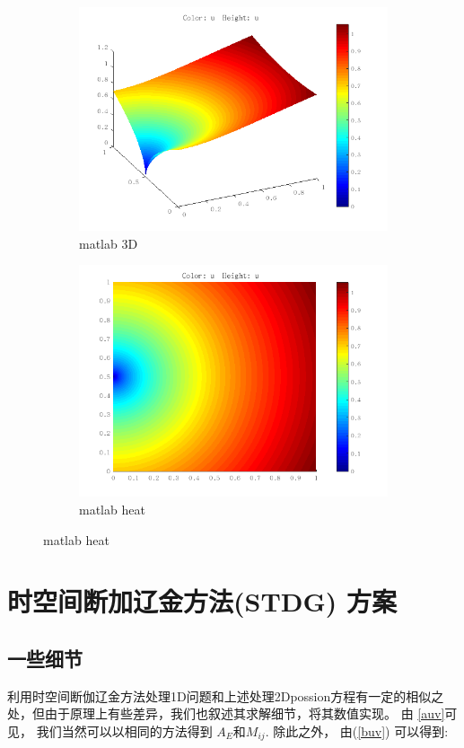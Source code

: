 \begin{figure}[H]
    \begin{subfigure}{0.5\textwidth}  
        \centering  
        \includegraphics[width=0.9\linewidth]{./pics/final/possion/2d/jumpexact3D.png}  
        \caption{matlab 3D}  
    \end{subfigure}%
    \begin{subfigure}{0.5\textwidth}  
        \centering  
        \includegraphics[width=0.9\linewidth]{./pics/final/possion/2d/jumpexactheat.png}  
        \caption{matlab heat}
    \end{subfigure} 
\end{figure} 

\section{时空间断加辽金方法(STDG) 方案}
\subsection{一些细节}
利用时空间断伽辽金方法处理1D问题和上述处理2Dpossion方程有一定的相似之处，但由于原理上有些差异，我们也叙述其求解细节，将其数值实现。 
由 \ref{auv}可见， 我们当然可以以相同的方法得到 $A_E$和$ M_{ij}$. 除此之外， 由(\ref{buv}) 可以得到:

